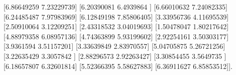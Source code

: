 \documentclass{article}%
\begin{document}
 {[}6.86649259 7.23229739{]}\newline%
 {[}6.20390081 6.4939864 {]}\newline%
 {[}6.66010632 7.24082335{]}\newline%
 {[}6.24485487 7.97983969{]}\newline%
 {[}6.12849198 7.85806405{]}\newline%
 {[}3.33956736 4.11695539{]}\newline%
 {[}2.50910064 3.12209251{]}\newline%
 {[}2.43318532 3.04019693{]}\newline%
 {[}1.50478047 1.80217642{]}\newline%
 {[}4.88979358 6.08957136{]}\newline%
 {[}4.74363899 5.93199602{]}\newline%
 {[}2.92254161 3.50303177{]}\newline%
 {[}3.9361594  3.51157201{]}\newline%
 {[}3.33639849 2.83970557{]}\newline%
 {[}5.04705875 5.26721256{]}\newline%
 {[}3.22635429 3.3057842 {]}\newline%
 {[}2.88296573 2.92263427{]}\newline%
 {[}3.30854455 3.5649735 {]}\newline%
 {[}6.18657807 6.32601814{]}\newline%
 {[}5.52366395 5.58627883{]}\newline%
 {[}6.36911627 6.85853512{]}{]}.\newline%
\newline%

%
\newpage%
\end{document}

